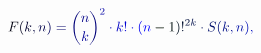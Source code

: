 \documentclass[12pt]{article}
\begin{document}
\makeatletter
\renewcommand*{\@textcolor}[3]{%
  \protect\leavevmode
  \begingroup
    \color#1{#2}#3%
  \endgroup
}
\makeatother
\begin{displaymath}
\mathcolor[RGB]{0,0,15}{F} \mathcolor[RGB]{0,0,30}{(} \mathcolor[RGB]{0,0,45}{k} \mathcolor[RGB]{0,0,60}{,} \mathcolor[RGB]{0,0,75}{n} \mathcolor[RGB]{0,0,90}{)} \mathcolor[RGB]{0,0,105}{=} \mathcolor[RGB]{0,0,120}{\binom { \mathcolor[RGB]{0,0,135}{n} } { \mathcolor[RGB]{0,0,150}{k} } } ^ { \mathcolor[RGB]{0,0,165}{2} } \mathcolor[RGB]{0,0,180}{\cdot} \mathcolor[RGB]{0,0,195}{k} \mathcolor[RGB]{0,0,210}{!} \mathcolor[RGB]{0,0,225}{\cdot} \mathcolor[RGB]{0,0,240}{(} \mathcolor[RGB]{0,0,255}{n} \mathcolor[RGB]{0,15,0}{-} \mathcolor[RGB]{0,15,15}{1} \mathcolor[RGB]{0,15,30}{)} \mathcolor[RGB]{0,15,45}{!} ^ { \mathcolor[RGB]{0,15,60}{2} \mathcolor[RGB]{0,15,75}{k} } \mathcolor[RGB]{0,15,90}{\cdot} \mathcolor[RGB]{0,15,105}{S} \mathcolor[RGB]{0,15,120}{(} \mathcolor[RGB]{0,15,135}{k} \mathcolor[RGB]{0,15,150}{,} \mathcolor[RGB]{0,15,165}{n} \mathcolor[RGB]{0,15,180}{)} \mathcolor[RGB]{0,15,195}{,}
\end{displaymath}
\end{document}
